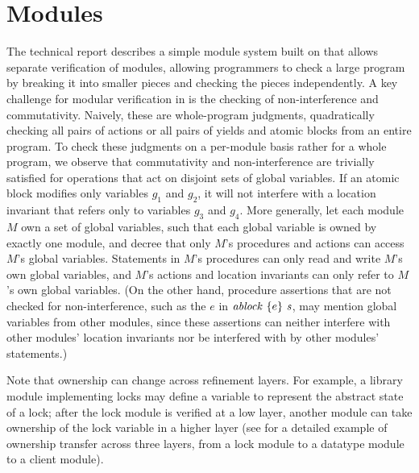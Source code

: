 \section{Modules}
\label{sec:modules}

The technical report\cite{gc-techreport} describes a simple module system built on \civl that allows separate verification of modules,
allowing programmers to check a large program by breaking it into smaller pieces and checking the pieces independently.
A key challenge for modular verification in \civl is the checking of non-interference and commutativity.
Naively, these are whole-program judgments,
quadratically checking all pairs of actions or all pairs of yields and atomic blocks from an entire program.
To check these judgments on a per-module basis rather for a whole program,
we observe that commutativity and non-interference are trivially satisfied for operations that act on disjoint sets of global variables.
If an atomic block modifies only variables $g_1$ and $g_2$, it will not interfere with a location invariant that refers only to variables $g_3$ and $g_4$.
More generally, let each module $M$ own a set of global variables, such that each global variable is owned by exactly one module,
and decree that only $M$'s procedures and actions can access $M$'s global variables.
Statements in $M$'s procedures can only read and write $M$'s own global variables,
and $M$'s actions and location invariants can only refer to $M$'s own global variables.
(On the other hand, procedure assertions that are not checked for non-interference,
such as the $e$ in $\mathit{ablock}\ {\{e\}}\ {\mathit{s}}$,
may mention global variables from other modules,
since these assertions can neither interfere with other modules' location invariants nor be interfered with by other modules' statements.)

Note that ownership can change across refinement layers.
For example, a library module implementing locks may define a variable to represent the abstract state of a lock;
after the lock module is verified at a low layer,
another module can take ownership of the lock variable in a higher layer
(see \cite{gc-techreport} for a detailed example of ownership transfer across three layers, from a lock module to a datatype module to a client module).
